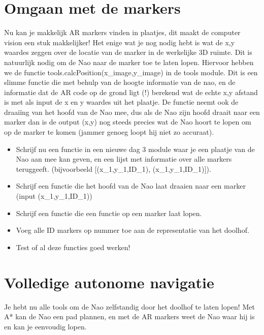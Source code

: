 \documentclass[a4paper]{article}
\begin{document}
\section{Omgaan met de markers}

Nu kan je makkelijk AR markers vinden in plaatjes, dit maakt de computer vision een stuk makkelijker! Het enige wat je nog nodig hebt is wat de x,y waardes zeggen over de locatie van de marker in de werkelijke 3D ruimte. Dit is natuurlijk nodig om de Nao naar de marker toe te laten lopen. Hiervoor hebben we de functie tools.calcPosition(x\_image,y\_image) in de tools module. Dit is een slimme functie die met behulp van de hoogte informatie van de nao, en de informatie dat de AR code op de grond ligt (!) berekend wat de echte x,y afstand is met als input de x en y waardes uit het plaatje. De functie neemt ook de draaiïng van het hoofd van de Nao mee, dus als de Nao zijn hoofd draait naar een marker dan is de output (x,y) nog steeds precies wat de Nao hoort te lopen om op de marker te komen (jammer genoeg loopt hij niet zo accuraat).

\begin{Exercise}
\begin{itemize}
\item Schrijf nu een functie in een nieuwe dag 3 module waar je een plaatje van de Nao aan mee kan geven, en een lijst met informatie over alle markers teruggeeft. (bijvoorbeeld [(x\_1,y\_1,ID\_1), (x\_1,y\_1,ID\_1)]).
\item Schrijf een functie die het hoofd van de Nao laat draaien naar een marker (input (x\_1,y\_1,ID\_1))
\item Schrijf een functie die een functie op een marker laat lopen.
\item Voeg alle ID markers op nummer toe aan de representatie van het doolhof.
\item Test of al deze functies goed werken!
\end{itemize}
\end{Exercise}
\vspace{10 mm}



\section{Volledige autonome navigatie}

Je hebt nu alle tools om de Nao zelfstandig door het doolhof te laten lopen! Met A* kan de Nao een pad plannen, en met de AR markers weet de Nao waar hij is en kan je eenvoudig lopen.
\end{document}
